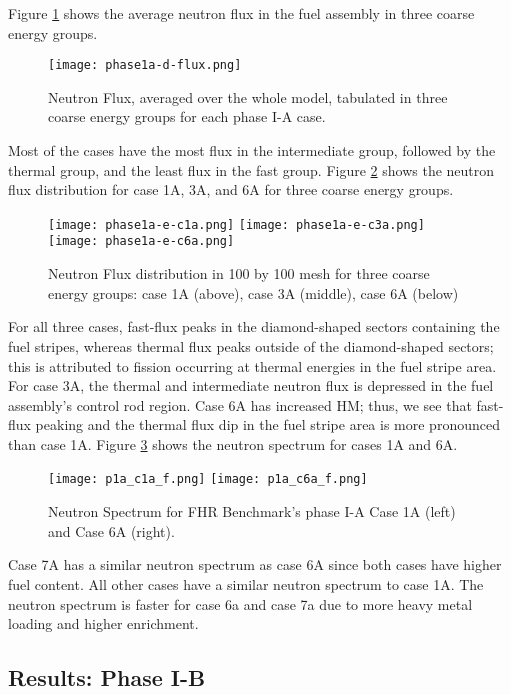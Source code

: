 Figure \ref{fig:phase1a-d} shows the average neutron flux in the fuel assembly in 
three coarse energy groups. 
\begin{figure}[]
    \centering
    \texttt{[image: phase1a-d-flux.png]} 
    \caption{Neutron Flux, averaged over the whole model, tabulated in three coarse 
    energy groups for each phase I-A case. }
    \label{fig:phase1a-d}
\end{figure}
Most of the cases have the most flux in the intermediate group, followed by 
the thermal group, and the least flux in the fast group.    
Figure \ref{fig:phase1a-e} shows the neutron flux distribution for case 1A, 
3A, and 6A for three coarse energy groups. 
\begin{figure}[]
    \centering
    \texttt{[image: phase1a-e-c1a.png]} 
    \texttt{[image: phase1a-e-c3a.png]} 
    \texttt{[image: phase1a-e-c6a.png]} 
    \caption{Neutron Flux distribution in 100 by 100 mesh for three coarse 
    energy groups: case 1A (above), case 3A (middle), case 6A (below) }
    \label{fig:phase1a-e}
\end{figure}
For all three cases, fast-flux peaks in the diamond-shaped sectors containing 
the fuel stripes, whereas thermal flux peaks outside of the diamond-shaped 
sectors; this is attributed to fission occurring at thermal energies in the 
fuel stripe area. 
For case 3A, the thermal and intermediate neutron flux is depressed in the fuel 
assembly's control rod region.  
Case 6A has increased \gls{HM}; thus, we see that fast-flux peaking and the 
thermal flux dip in the fuel stripe area is more pronounced than case 1A.
Figure \ref{fig:phase1a-f} shows the neutron spectrum for cases 1A and 6A. 
\begin{figure}[]
    \centering
    \texttt{[image: p1a\_c1a\_f.png]} 
    \texttt{[image: p1a\_c6a\_f.png]} 
    \caption{Neutron Spectrum for \gls{FHR} Benchmark's phase I-A Case 1A 
    (left) and Case 6A (right).}
    \label{fig:phase1a-f}
\end{figure}
Case 7A has a similar neutron spectrum as case 6A since both cases have 
higher fuel content. 
All other cases have a similar neutron spectrum to case 1A.
The neutron spectrum is faster for case 6a and case 7a due to more heavy metal 
loading and higher enrichment.  

\subsection{Results: Phase I-B}


